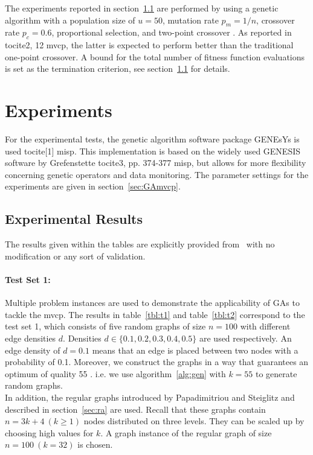 \documentclass[12pt]{article}
\begin{document}
The experiments reported in section~\ref{sec:er} are performed
by using a genetic algorithm with a population size of
$u = 50$, mutation rate $p_m = 1/n$, crossover rate
$p_c = 0.6$, proportional selection, and two-point crossover \cite{mvcp-back}.
As reported in tocite{2, 12 mvcp}, the latter is expected to perform
better than the traditional one-point crossover.
A bound for the total number
of fitness function evaluations is set as the termination
criterion, see section~\ref{sec:er} for details.


\section{Experiments}
For the experimental tests,
the genetic algorithm software package GENEsYs is used tocite{[1] misp}.
This implementation is based on the widely used GENESIS software by Grefenstette tocite{3, pp. 374-377 misp},
but allows for more  flexibility concerning genetic operators and data monitoring.
The parameter settings for the experiments are
given in section~\ref{sec:GAmvcp}.


\subsection{Experimental Results}
\label{sec:er}
The results given within the tables are explicitly provided
from~\cite{mvcp-back} with no modification or any sort of validation.

\paragraph{Test Set 1:}
Multiple problem instances are used to demonstrate the applicability of GAs to tackle the mvcp.
The results in table~\ref{tbl:t1}
and table~\ref{tbl:t2} correspond to the test set 1, which consists of
five random graphs of size $n = 100$ with different
edge densities $d$.
Densities $d \in \{0.1, 0.2, 0.3, 0.4, 0.5\}$ are used respectively.
An edge density of $d = 0.1$ means that an edge is placed between two
nodes with a probability of 0.1.
Moreover, we construct the graphs in a way that guarantees an optimum of quality 55 \cite{mvcp-back}.
i.e. we use algorithm~\ref{alg:gen} with $k = 55$ to generate random graphs.\\
In addition, the regular graphs introduced by
Papadimitriou and Steiglitz and described in section~\ref{sec:ra} are used.
Recall that these graphs contain $n=3k+4 \ (k \geq 1)$ nodes distributed on three levels.
They can be scaled up by choosing high values for $k$.
A graph instance of the regular graph of size $n = 100 \  (k=32)$ is chosen.
\end{document}
